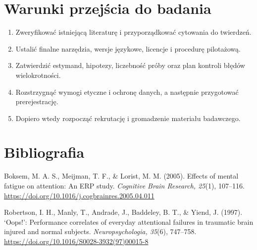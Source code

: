 \documentclass[11pt,a4paper]{article}
\begin{document}
\section{Warunki przejścia do badania}
\begin{enumerate}
\item Zweryfikować istniejącą literaturę i przyporządkować cytowania do twierdzeń.
\item Ustalić finalne narzędzia, wersje językowe, licencje i procedurę pilotażową.
\item Zatwierdzić estymand, hipotezy, liczebność próby oraz plan kontroli błędów wielokrotności.
\item Rozstrzygnąć wymogi etyczne i ochronę danych, a następnie przygotować prerejestrację.
\item Dopiero wtedy rozpocząć rekrutację i gromadzenie materiału badawczego.
\end{enumerate}
\section*{Bibliografia}

{\setlength{\parindent}{0pt}
\setlength{\parskip}{5pt}
\hangindent=1.27cm
Boksem, M. A. S., Meijman, T. F., \& Lorist, M. M. (2005). Effects of mental fatigue on attention: An ERP study. \textit{Cognitive Brain Research, 25}(1), 107--116. \url{https://doi.org/10.1016/j.cogbrainres.2005.04.011}\par
\hangindent=1.27cm
Robertson, I. H., Manly, T., Andrade, J., Baddeley, B. T., \& Yiend, J. (1997). ‘Oops!’: Performance correlates of everyday attentional failures in traumatic brain injured and normal subjects. \textit{Neuropsychologia, 35}(6), 747--758. \url{https://doi.org/10.1016/S0028-3932(97)00015-8}\par
}
\end{document}
